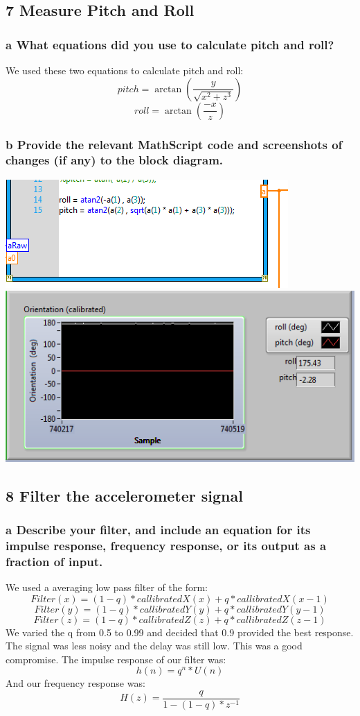 \documentclass[10pt,a4paper]{article}
\begin{document}
  \subsection*{7 Measure Pitch and Roll}
    \subsubsection*{a What equations did you use to calculate pitch and roll?}
      We used these two equations to calculate pitch and roll:
        \[pitch = \arctan(\frac{y}{\sqrt{x^2 + z^3}})\]
        \[roll = \arctan(\frac{-x}{z})\]
    \subsubsection*{b Provide the relevant MathScript code and screenshots of changes (if any) to the block diagram.}
    \includegraphics{../lab1_data/lab1_7a.PNG} \\[1em] 
    \includegraphics{../lab1_data/lab1_7b.PNG} 
  \subsection*{8 Filter the accelerometer signal}
    \subsubsection*{a Describe your filter, and include an equation for its impulse response, frequency response, or its output as a fraction of input.}
      We used a averaging low pass filter of the form:
        \[Filter(x) = (1 - q)*callibratedX(x) + q*callibratedX(x-1)\]
        \[Filter(y) = (1 - q)*callibratedY(y) + q*callibratedY(y-1)\]
        \[Filter(z) = (1 - q)*callibratedZ(z) + q*callibratedZ(z-1)\]
      We varied the q from 0.5 to 0.99 and decided that 0.9 provided the best response. The signal was less noisy and the delay was still low. This was a good compromise. 
      The impulse response of our filter was:
        \[h(n) = q^n*U(n)\]
      And our frequency response was:
        \[H(z) = \frac{q}{1 - (1 - q)*z^{-1}}\]
\end{document}
